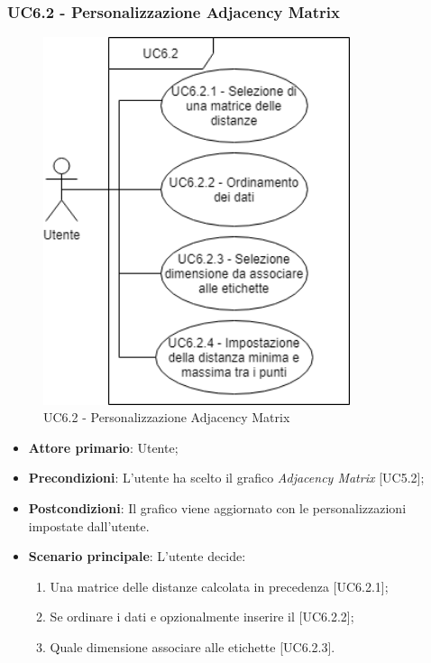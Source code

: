 \subsubsection{UC6.2 - Personalizzazione Adjacency Matrix}
\begin{figure}[h]
\includegraphics[width=9cm]{Section/Images/UC6.2.png}
\centering
\caption{UC6.2 - Personalizzazione Adjacency Matrix}
\end{figure}
\begin{itemize}
	\item \textbf{Attore primario}: Utente;
	
	\item \textbf{Precondizioni}: L'utente ha scelto il grafico \textit{Adjacency Matrix} [UC5.2];
	
	\item \textbf{Postcondizioni}: Il grafico viene aggiornato con le personalizzazioni impostate dall'utente.
	
	\item \textbf{Scenario principale}: L'utente decide:
	
\begin{enumerate}
\item Una matrice delle distanze calcolata in precedenza [UC6.2.1];
\item Se ordinare i dati e opzionalmente inserire il  [UC6.2.2];
\item Quale dimensione associare alle etichette [UC6.2.3].
\end{enumerate}	
		
\end{itemize}
